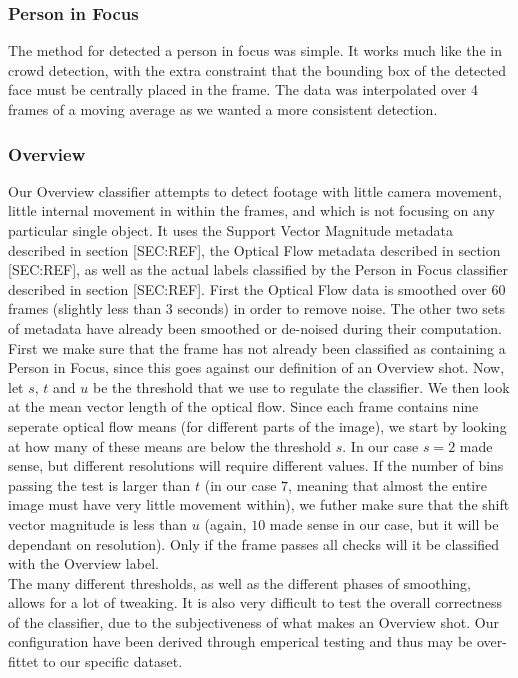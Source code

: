 \subsubsection{Person in Focus}
%
The method for detected a person in focus was simple. It works much like the in crowd detection, with the extra constraint that the bounding box of the detected face must be centrally placed in the frame. The data was interpolated over 4 frames of a moving average as we wanted a more consistent detection.
%
\subsubsection{Overview}
%
Our Overview classifier attempts to detect footage with little camera movement, little internal movement in within the frames, and which is not focusing on any particular single object. It uses the Support Vector Magnitude metadata described in section [SEC:REF], the Optical Flow metadata described in section [SEC:REF], as well as the actual labels classified by the Person in Focus classifier described in section [SEC:REF]. First the Optical Flow data is smoothed over 60 frames (slightly less than 3 seconds) in order to remove noise. The other two sets of metadata have already been smoothed or de-noised during their computation.\\
First we make sure that the frame has not already been classified as containing a Person in Focus, since this goes against our definition of an Overview shot. Now, let $s$, $t$ and $u$ be the threshold that we use to regulate the classifier. We then look at the mean vector length of the optical flow. Since each frame contains nine seperate optical flow means (for different parts of the image), we start by looking at how many of these means are below the threshold $s$. In our case $s=2$ made sense, but different resolutions will require different values. If the number of bins passing the test is larger than $t$ (in our case $7$, meaning that almost the entire image must have very little movement within), we futher make sure that the shift vector magnitude is less than $u$ (again, $10$ made sense in our case, but it will be dependant on resolution). Only if the frame passes all checks will it be classified with the Overview label.\\
The many different thresholds, as well as the different phases of smoothing, allows for a lot of tweaking. It is also very difficult to test the overall correctness of the classifier, due to the subjectiveness of what makes an Overview shot. Our configuration have been derived through emperical testing and thus may be over-fittet to our specific dataset.
%
